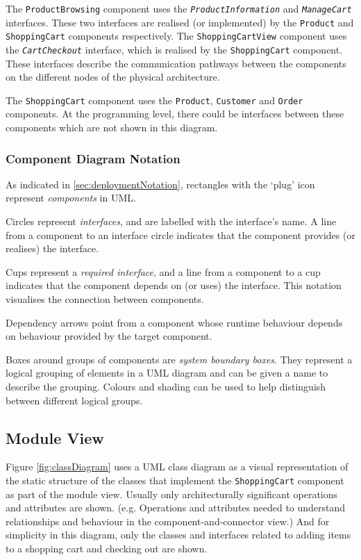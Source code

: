 The \texttt{ProductBrowsing} component uses the \texttt{\textsl{ProductInformation}} and \texttt{\textsl{ManageCart}} interfaces.
These two interfaces are realised (or implemented) by the \texttt{Product} and \texttt{ShoppingCart} components respectively.
The \texttt{ShoppingCartView} component uses the \texttt{\textsl{CartCheckout}} interface, which is realised by the \texttt{ShoppingCart} component.
These interfaces describe the communication pathways between the components on the different nodes of the physical architecture.

The \texttt{ShoppingCart} component uses the \texttt{Product}, \texttt{Customer} and \texttt{Order} components.
At the programming level, there could be interfaces between these components which are not shown in this diagram.

\subsubsection{Component Diagram Notation}\label{sec:componentNotation}
As indicated in \ref{sec:deploymentNotation}, rectangles with the `plug' icon represent \emph{components} in UML.

Circles represent \emph{interfaces}, and are labelled with the interface's name.
A line from a component to an interface circle indicates that the component provides (or realises) the interface.

Cups represent a \emph{required interface}, and a line from a component to a cup indicates that the component depends on (or uses) the interface.
This notation visualises the connection between components.

Dependency arrows point from a component whose runtime behaviour depends on behaviour provided by the target component.

Boxes around groups of components are \emph{system boundary boxes}.
They represent a logical grouping of elements in a UML diagram and can be given a name to describe the grouping.
Colours and shading can be used to help distinguish between different logical groups.

\subsection{Module View}\label{sec_moduleView}
Figure \ref{fig:classDiagram} uses a UML class diagram as a visual representation of the static structure
of the classes that implement the \texttt{ShoppingCart} component as part of the module view.
Usually only architecturally significant operations and attributes are shown.
(e.g. Operations and attributes needed to understand relationships and behaviour in the component-and-connector view.)
And for simplicity in this diagram, only the classes and interfaces related to adding items to a shopping cart and checking out are shown.

